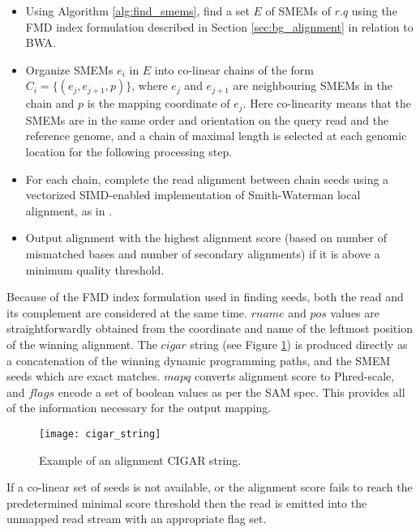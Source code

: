 \begin{itemize}
    \item Using Algorithm \ref{alg:find_smems}, find a set $E$ of SMEMs of $r.q$\autocite{Li2013} using the FMD index formulation described in Section \ref{sec:bg_alignment} in relation to BWA. 
    \item Organize SMEMs $e_i$ in $E$ into co-linear chains of the form $C_i = \{(e_j,e_{j+1},p)\}$, where $e_j$ and $e_{j+1}$ are neighbouring SMEMs in the chain and $p$ is the mapping coordinate of $e_j$. Here co-linearity means that the SMEMs are in the same order and orientation on the query read and the reference genome, and a chain of maximal length is selected at each genomic location for the following processing step.
    \item For each chain, complete the read alignment between chain seeds using a vectorized SIMD-enabled implementation of Smith-Waterman local alignment, as in \autocite{farrar2006striped}.
    \item Output alignment with the highest alignment score (based on number of mismatched bases and number of secondary alignments) if it is above a minimum quality threshold. 
\end{itemize}

Because of the FMD index formulation used in finding seeds, both the read and its complement are considered at the same time. $rname$ and $pos$ values are straightforwardly obtained from the coordinate and name of the leftmost position of the winning alignment. The $cigar$ string (see Figure \ref{fig:main_body_cigar_string}) is produced directly as a concatenation of the winning dynamic programming paths, and the SMEM seeds which are exact matches. $mapq$ converts alignment score to Phred-scale, and $flags$ encode a set of boolean values as per the SAM spec. This provides all of the information necessary for the output mapping.

\begin{figure}[H]
    \texttt{[image: cigar\_string]}
    \centering
    \caption {Example of an alignment CIGAR string.}
    \label{fig:main_body_cigar_string}
\end{figure}

If a co-linear set of seeds is not available, or the alignment score fails to reach the predetermined minimal score threshold then the read is emitted into the unmapped read stream with an appropriate flag set.

